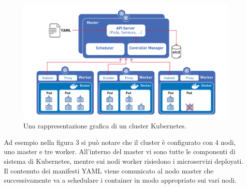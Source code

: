 \documentclass[a4paper,12pt]{report}
\begin{document}
\begin{figure}[h]
	\includegraphics[width=1.0\textwidth]{k8s}
    \caption{Una rappresentazione grafica di un cluster Kubernetes. \cite{k8simg}}
    \label{fig:k8s}
\end{figure}

Ad esempio nella figura 3 si può notare che il cluster è configurato con 4 nodi, uno master e tre worker. All'interno del master vi sono tutte le componenti di sistema di Kubernetes, mentre sui nodi worker risiedono i microservizi deployati. Il contenuto dei manifesti YAML viene comunicato al nodo master che successivamente va a schedulare i container in modo appropriato sui vari nodi.
\end{document}

